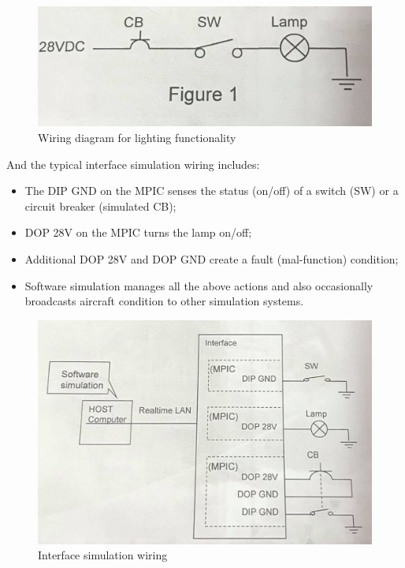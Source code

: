         \begin{figure}[H]
            \centering
            \includegraphics[width=0.6\linewidth]{img/figure1.jpg}
            \caption{Wiring diagram for lighting functionality}
        \end{figure}
        And the typical interface simulation wiring includes:
        \begin{itemize}
            \item The DIP GND on the MPIC senses the status (on/off) of a switch (SW) or a circuit breaker (simulated CB);
            \item DOP 28V on the MPIC turns the lamp on/off;
            \item Additional DOP 28V and DOP GND create a fault (mal-function) condition;
            \item Software simulation manages all the above actions and also occasionally broadcasts aircraft condition to other simulation 
            systems.
        \end{itemize}
        \begin{figure}[H]
            \centering
            \includegraphics[width=0.6\linewidth]{img/figure2.jpg}
            \caption{Interface simulation wiring}
        \end{figure}
